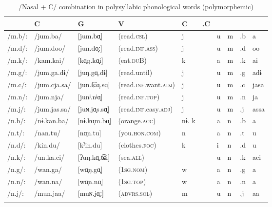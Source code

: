 \begin{table}\footnotesize
\caption{/Nasal + C/ combination in polysyllabic phonological words (polymorphemic)}
\begin{tabular}{ *{10}{l} }
\lsptoprule
 \multicolumn{4}{l}{} &  {C} & {G} & {V} & {C} & {.C} & {}\\\midrule
{/m.b/:} & {/jum.ba/}     & [jum.bɑ̟]      &  {(read.\textsc{csl})}          &   j   & &  u & m & .b &a\\
{/m.d/:} & {/jum.doo/}    & [jun.do̞ː]     &  {(read.\textsc{inf}.\textsc{ass})}      &   j   & &  u & m & .d &oo\\
{/m.k/:} & {/kam.kai/}    & [kɑ̟ŋ.kɑ̟i]    &   {(eat.\textsc{du}B)}          &    k  & &   a&  m&  .k& ai\\
{/m.g/:} & {/jum.ga.dɨ/}  & [juŋ.gɑ̟.dɨ]   &  {(read.until)}        &   j   & &  u & m & .g &adɨ\\
{/m.c/:} & {/jum.cja.sa/} & [jun.t͡ɕɑ̟.sɑ̟]&   {(read.\textsc{inf}.want.\textsc{adj})}&    j  &  &   u&  m&  .c& jasa\\
{/m.n/:} & {/jum.nja/}    & [junʲ.nʲɑ̟]    &  {(read.\textsc{inf}.\textsc{top})}      &   j   & &  u & m & .n &ja\\
{/m.j/:} & {/jum.jas.sa/} & [juɴ.jɑ̟s.sɑ̟] &   {(read.\textsc{inf}.easy.\textsc{adj})}&    j  & &   u&  m&  .j& assa\\
{/n.b/:} & {/nɨ.kan.ba/}  & [nɨ.kɑ̟m.bɑ̟]  &   {(orange.\textsc{acc})}       &    nɨ.   k  & &  a & n & .b & a\\
{/n.t/:} & {/nan.tu/}     & [nɑ̟n.tu]      &  {(you.\textsc{hon}.\textsc{com})}       &   n &   &  a  &  n& .t& u\\
{/n.d/:} & {/kin.du/}     & [kˀin.du]      & {(clothes.\textsc{foc})}        &  k &   & i   & n &.d &u\\
{/n.k/:} & {/un.ka.ci/}   & [ʔuŋ.kɑ̟.t͡ɕi] &  {(sea.\textsc{all})}           & & &   u   &  n  &  .k & aci\\
{/n.g/:} & {/wan.ga/}     & [wɑ̟ŋ.gɑ̟]     &   {(1\textsc{sg}.\textsc{nom})}          &    w  & &   a &    n & .g & a\\
{/n.n/:} & {/wan.na/}     & [wɑ̟n.nɑ̟]     &   {(1\textsc{sg}.\textsc{top})}          &    w  & &   a &   n & .n & a\\
{/n.j/:} & {/mun.jaa/}    & [muɴ.jɑ̟ː]     &  {(\textsc{advrs}.\textsc{sol})}         &   m   & &  u  &  n & .j & aa\\
\lspbottomrule
\end{tabular}
\end{table}

